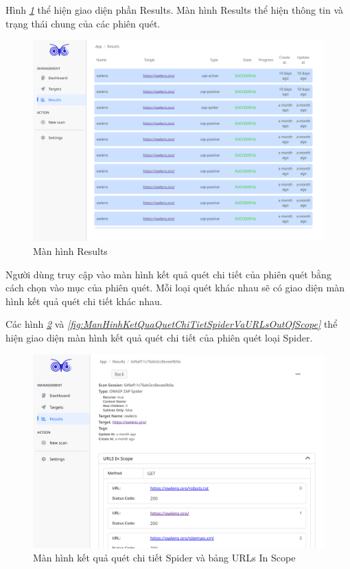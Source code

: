 \tab \tab Hình \textit{\ref{fig:ManHinhResults} } thể hiện giao diện phần Results.
Màn hình Results thể hiện thông tin và trạng thái chung của các phiên quét.

\begin{figure}[H]
      \centering
      \includegraphics[width=\textwidth]{applied-thesis-chapters/chapter-6/Màn hình Results.png}
      \caption{Màn hình Results}
      \label{fig:ManHinhResults}
\end{figure}

Người dùng truy cập vào màn hình kết quả quét chi tiết của phiên quét bằng cách chọn vào mục của phiên quét.
Mỗi loại quét khác nhau sẽ có giao diện màn hình kết quả quét chi tiết khác nhau.

Các hình \textit{\ref{fig:ManHinhKetQuaQuetChiTietSpiderVaURLsInScope} } 
và \textit{\ref{fig:ManHinhKetQuaQuetChiTietSpiderVaURLsOutOfScope} } 
thể hiện giao diện màn hình kết quả quét chi tiết của phiên quét loại Spider.

\begin{figure}[H]
      \centering
      \includegraphics[width=\textwidth]{applied-thesis-chapters/chapter-6/Màn hình kết quả quét chi tiết Spider và bảng URLs In Scope.png}
      \caption{Màn hình kết quả quét chi tiết Spider và bảng URLs In Scope}
      \label{fig:ManHinhKetQuaQuetChiTietSpiderVaURLsInScope}
\end{figure}

